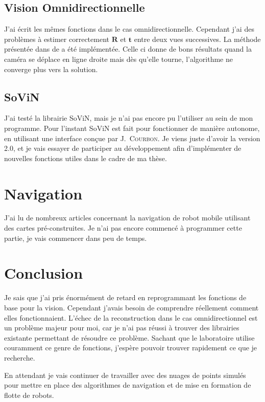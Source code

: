 \documentclass[10pt]{article}
\begin{document}
\subsection{Vision Omnidirectionnelle}

J'ai écrit les mêmes fonctions dans le cas omnidirectionnelle.
Cependant j'ai des problèmes à estimer correctement $\mathbf{R}$ et $\mathbf{t}$ entre deux vues successives.
La méthode présentée dans  de \citeauthor{Puig11PhD} a été implémentée.
Celle ci donne de bons résultats quand la caméra se déplace en ligne droite mais dès qu'elle tourne, l'algorithme ne converge plus vers la solution.

\subsection{SoViN}

J'ai testé la librairie SoViN, mais je n'ai pas encore pu l'utiliser au sein de mon programme. Pour l'instant SoViN est fait pour fonctionner de manière autonome, en utilisant une interface conçue par J.~\textsc{Courbon}.
Je viens juste d'avoir la version 2.0, et je vais essayer de participer au développement afin d'implémenter de nouvelles fonctions utiles dans le cadre de ma thèse.

\section{Navigation}

J'ai lu de nombreux articles concernant la navigation de robot mobile utilisant des cartes pré-construites.
Je n'ai pas encore commencé à programmer cette partie, je vais commencer dans peu de temps.

\section{Conclusion}

Je sais que j'ai pris énormément de retard en reprogrammant les fonctions de base pour la vision.
Cependant j'avais besoin de comprendre réellement comment elles fonctionnaient.
L'échec de la reconstruction dans le cas omnidirectionnel est un problème majeur pour moi, car je n'ai pas réussi à trouver des librairies existante permettant de résoudre ce problème.
Sachant que le laboratoire utilise couramment ce genre de fonctions, j'espère pouvoir trouver rapidement ce que je recherche.

En attendant je vais continuer de travailler avec des nuages de points simulés pour mettre en place des algorithmes de navigation et de mise en formation de flotte de robots.
\end{document}
